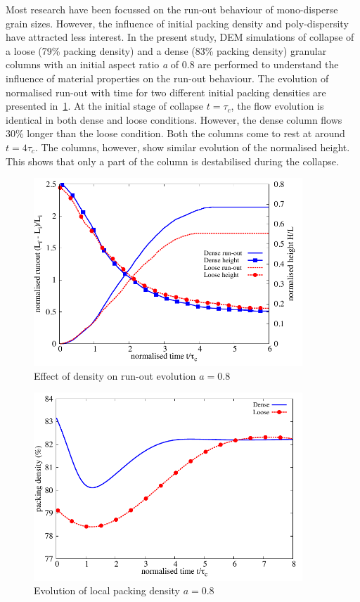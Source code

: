 Most research have been focussed on the run-out behaviour of mono-disperse 
grain sizes. However, the influence of initial packing density and 
poly-dispersity have attracted less interest. In the present study, DEM 
simulations of collapse of a loose (79\% packing density) and a dense (83\% 
packing density) granular columns with an initial aspect ratio \textit{a} of 
0.8 are performed to understand the influence of material properties on the 
run-out behaviour. The evolution of normalised run-out with time for two 
different initial packing densities are presented 
in~\cref{fig:runout_height_dense_r18}. At the initial 
stage of collapse $t=\tau_c$, the flow evolution is identical in both dense and 
loose conditions. However, the dense column flows 30\% longer than the loose 
condition. Both the columns come to rest at around $t = 4\tau_c$. The columns, 
however, show similar evolution of the normalised height. This shows that only 
a part of the column is destabilised during the collapse.
\begin{figure}[h]
\centering
\includegraphics[width=0.9\textwidth]{runout_height_dense_r18}
\caption{Effect of density on run-out evolution $a = 0.8$}
\label{fig:runout_height_dense_r18}
\end{figure}

\begin{figure}[h]
\centering
\includegraphics[width=0.9\textwidth]{voro_r18}
\caption{Evolution of local packing density $a = 0.8$}
\label{fig:voro_r18}
\end{figure}

